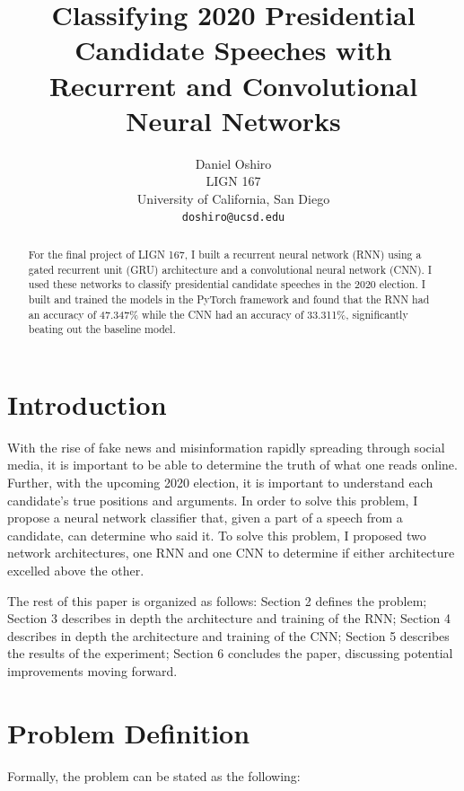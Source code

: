 \documentclass{article}
\title{Classifying 2020 Presidential Candidate Speeches with Recurrent and Convolutional Neural Networks}
\author{
  Daniel Oshiro \\
  LIGN 167 \\
  University of California, San Diego\\
  \texttt{doshiro@ucsd.edu}
}
\begin{document}
\maketitle

\begin{abstract}
For the final project of LIGN 167, I built a recurrent neural network (RNN) using a gated recurrent unit (GRU) architecture and a convolutional neural network (CNN). I used these networks to classify presidential candidate speeches in the 2020 election. I built and trained the models in the PyTorch framework and found that the RNN had an accuracy of 47.347\% while the CNN had an accuracy of 33.311\%, significantly beating out the baseline model.
\end{abstract}

\section{Introduction}
With the rise of fake news and misinformation rapidly spreading through social media, it is important to be able to determine the truth of what one reads online. Further, with the upcoming 2020 election, it is important to understand each candidate's true positions and arguments. In order to solve this problem, I propose a neural network classifier that, given a part of a speech from a candidate, can determine who said it. To solve this problem, I proposed two network architectures, one RNN and one CNN to determine if either architecture excelled above the other. 

The rest of this paper is organized as follows: Section 2 defines the problem; Section 3 describes in depth the architecture and training of the RNN; Section 4 describes in depth the architecture and training of the CNN; Section 5 describes the results of the experiment; Section 6 concludes the paper, discussing potential improvements moving forward.

\section{Problem Definition}
Formally, the problem can be stated as the following:
\end{document}
